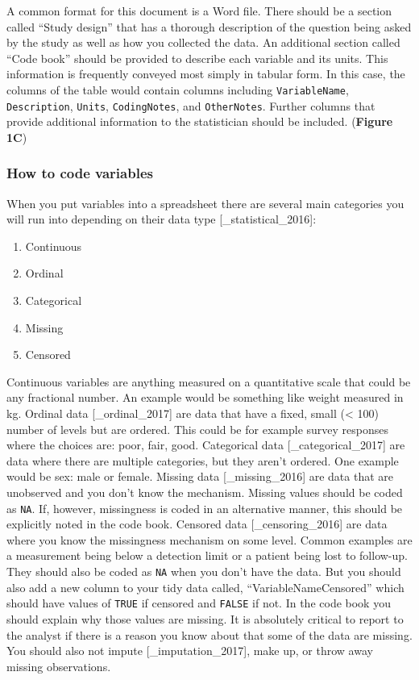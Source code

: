 \documentclass[12pt]{article}
\providecommand{\tightlist}{%
  \setlength{\itemsep}{0pt}\setlength{\parskip}{0pt}}
\begin{document}
A common format for this document is a Word file. There should be a
section called ``Study design'' that has a thorough description of the
question being asked by the study as well as how you collected the data.
An additional section called ``Code book'' should be provided to
describe each variable and its units. This information is frequently
conveyed most simply in tabular form. In this case, the columns of the
table would contain columns including \texttt{VariableName},
\texttt{Description}, \texttt{Units}, \texttt{CodingNotes}, and
\texttt{OtherNotes}. Further columns that provide additional information
to the statistician should be included. (\textbf{Figure 1C})

\subsubsection{How to code variables}\label{how-to-code-variables}

When you put variables into a spreadsheet there are several main
categories you will run into depending on their data type
{[}\_statistical\_2016{]}:

\begin{enumerate}
\def\labelenumi{\arabic{enumi}.}
\tightlist
\item
  Continuous
\item
  Ordinal
\item
  Categorical
\item
  Missing
\item
  Censored
\end{enumerate}

Continuous variables are anything measured on a quantitative scale that
could be any fractional number. An example would be something like
weight measured in kg. Ordinal data {[}\_ordinal\_2017{]} are data that
have a fixed, small (\textless{} 100) number of levels but are ordered.
This could be for example survey responses where the choices are: poor,
fair, good. Categorical data {[}\_categorical\_2017{]} are data where
there are multiple categories, but they aren't ordered. One example
would be sex: male or female. Missing data {[}\_missing\_2016{]} are
data that are unobserved and you don't know the mechanism. Missing
values should be coded as \texttt{NA}. If, however, missingness is coded
in an alternative manner, this should be explicitly noted in the code
book. Censored data {[}\_censoring\_2016{]} are data where you know the
missingness mechanism on some level. Common examples are a measurement
being below a detection limit or a patient being lost to follow-up. They
should also be coded as \texttt{NA} when you don't have the data. But
you should also add a new column to your tidy data called,
``VariableNameCensored'' which should have values of \texttt{TRUE} if
censored and \texttt{FALSE} if not. In the code book you should explain
why those values are missing. It is absolutely critical to report to the
analyst if there is a reason you know about that some of the data are
missing. You should also not impute {[}\_imputation\_2017{]}, make up,
or throw away missing observations.
\end{document}
